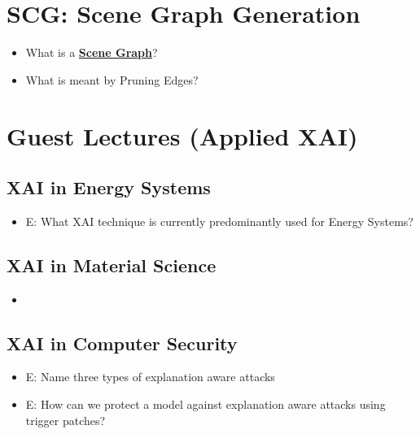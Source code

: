 \documentclass{report}
\begin{document}
	\section{SCG: Scene Graph Generation}
	
	\begin{itemize}
	\item What is a \textbf{\underline{Scene Graph}}?
	\newline 
	\item What is meant by Pruning Edges?
	\newline 
	\end{itemize}

	\section{Guest Lectures (Applied XAI)}
	
		\subsection{XAI in Energy Systems}
		
		\begin{itemize}
		\item E: What XAI technique is currently predominantly used for Energy Systems?
		\newline 
		\end{itemize}
	
		\subsection{XAI in Material Science}
		
		\begin{itemize}
		\item 
		\end{itemize}
	
		\subsection{XAI in Computer Security}
		
		\begin{itemize}
		\item E: Name three types of explanation aware attacks
		\newline 
		\item E: How can we protect a model against explanation aware attacks using trigger patches?
		\newline 
		\end{itemize}
	
\end{document}
